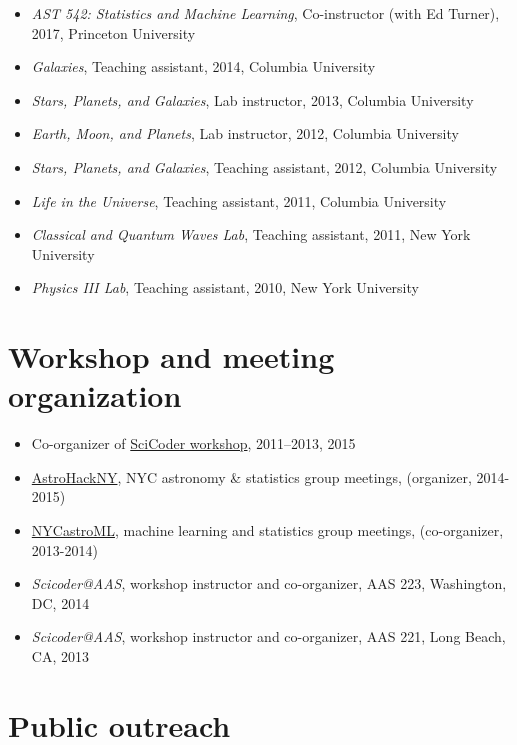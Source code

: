 \documentclass[12pt,letterpaper]{article}
\begin{document}
\begin{itemize}
	\item \emph{AST 542: Statistics and Machine Learning}, Co-instructor (with Ed Turner), 2017, Princeton University
    \item \emph{Galaxies}, Teaching assistant, 2014, Columbia University
	\item \emph{Stars, Planets, and Galaxies}, Lab instructor, 2013, Columbia University
	\item \emph{Earth, Moon, and Planets}, Lab instructor, 2012, Columbia University
	\item \emph{Stars, Planets, and Galaxies}, Teaching assistant, 2012, Columbia University
	\item \emph{Life in the Universe}, Teaching assistant, 2011, Columbia University
	\item \emph{Classical and Quantum Waves Lab}, Teaching assistant, 2011, New York University
	\item \emph{Physics III Lab}, Teaching assistant, 2010, New York University
\end{itemize}

\section*{Workshop and meeting organization}

\begin{itemize}
    \item Co-organizer of \href{http://scicoder.org}{SciCoder workshop}, 2011--2013, 2015
    \item \href{https://groups.google.com/forum/#!forum/astrohackny}{AstroHackNY}, NYC astronomy \& statistics group meetings, (organizer, 2014-2015)
    \item \href{https://github.com/adrn/nycastroml}{NYCastroML}, machine learning and statistics group meetings, (co-organizer, 2013-2014)
    \item \emph{Scicoder@AAS}, workshop instructor and co-organizer, AAS 223, Washington, DC, 2014
    \item \emph{Scicoder@AAS}, workshop instructor and co-organizer, AAS 221, Long Beach, CA, 2013
\end{itemize}

\section*{Public outreach}
\end{document}
